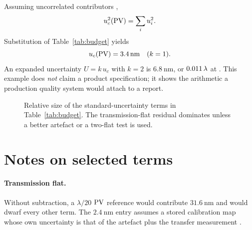 Assuming uncorrelated contributors \cite{jcgm100},
\begin{equation}
  u_c^2(\mathrm{PV}) = \sum_i u_i^2.
  \label{eq:uc}
\end{equation}
Substitution of Table~\ref{tab:budget} yields
\begin{equation}
  u_c(\mathrm{PV}) = \SI{3.4}{\nano\meter} \quad (k=1).
  \label{eq:ucnum}
\end{equation}
An expanded uncertainty \(U = k\,u_c\) with \(k=2\) is \(\SI{6.8}{\nano\meter}\), or \(0.011\,\lambda\) at \wavelength. This example does \emph{not} claim a product specification; it shows the arithmetic a production quality system would attach to a report.

\begin{figure}[ht]
\centering
{}
\caption{Relative size of the standard-uncertainty terms in Table~\ref{tab:budget}. The transmission-flat residual dominates unless a better artefact or a two-flat test is used.}
\label{fig:bars}
\end{figure}

\section{Notes on selected terms}

\paragraph{Transmission flat.}
Without subtraction, a \(\lambda/20\) \(\mathrm{PV}\) reference would contribute \(\SI{31.6}{\nano\meter}\) and would dwarf every other term. The \(\SI{2.4}{\nano\meter}\) entry assumes a stored calibration map whose own uncertainty is that of the artefact plus the transfer measurement \cite{malacara2007}.

